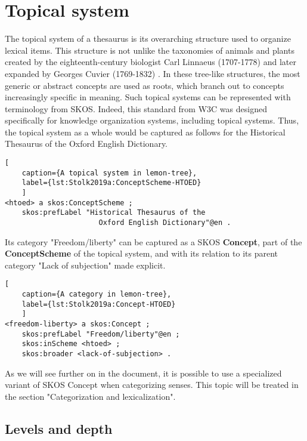 \section{Topical system}

The topical system of a thesaurus is its overarching structure used to organize lexical items. This structure is not unlike the taxonomies of animals and plants created by the eighteenth-century biologist Carl Linnaeus (1707-1778) and later expanded by Georges Cuvier (1769-1832) \cite{faria_georges_2013}. 
In these tree-like structures, the most generic or abstract concepts are used as roots, which branch out to concepts increasingly specific in meaning.
Such topical systems can be represented with terminology from SKOS. Indeed, this standard from W3C was designed specifically for knowledge organization systems, including topical systems. Thus, the topical system as a whole would be captured as follows for the Historical Thesaurus of the Oxford English Dictionary.

\noindent
\begin{minipage}[c]{\textwidth}
	\begin{lstlisting}[
	caption={A topical system in lemon-tree},
	label={lst:Stolk2019a:ConceptScheme-HTOED}
	]
<htoed> a skos:ConceptScheme ;
	skos:prefLabel "Historical Thesaurus of the 
	                  Oxford English Dictionary"@en .
	\end{lstlisting}
\end{minipage}

\noindent
Its category "Freedom/liberty" can be captured as a SKOS \textbf{Concept}, part of the \textbf{ConceptScheme} of the topical system, and with its relation to its parent category "Lack of subjection" made explicit.

\noindent
\begin{minipage}[c]{\textwidth}
	\begin{lstlisting}[
	caption={A category in lemon-tree},
	label={lst:Stolk2019a:Concept-HTOED}
	]
<freedom-liberty> a skos:Concept ;
	skos:prefLabel "Freedom/liberty"@en ;
	skos:inScheme <htoed> ; 
	skos:broader <lack-of-subjection> .
	\end{lstlisting}
\end{minipage}

As we will see further on in the document, it is possible to use a specialized variant of SKOS Concept when categorizing senses. This topic will be treated in the section "Categorization and lexicalization".


\subsection{Levels and depth}

